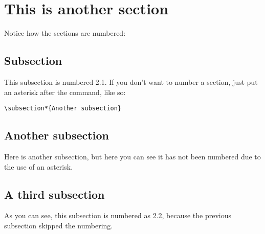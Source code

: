 \documentclass[a4paper,12pt]{article}
\begin{document}
\section{This is another section}
Notice how the sections are numbered:
\subsection{Subsection}
This subsection is numbered 2.1. If you don't want to number a section, just put an asterisk after the command, like so:

\begin{verbatim}
\subsection*{Another subsection}
\end{verbatim}

\subsection*{Another subsection}
Here is another subsection, but here you can see it has not been numbered due to the use of an asterisk.

\subsection{A third subsection}
As you can see, this subsection is numbered as 2.2, because the previous subsection skipped the numbering.
\end{document}
